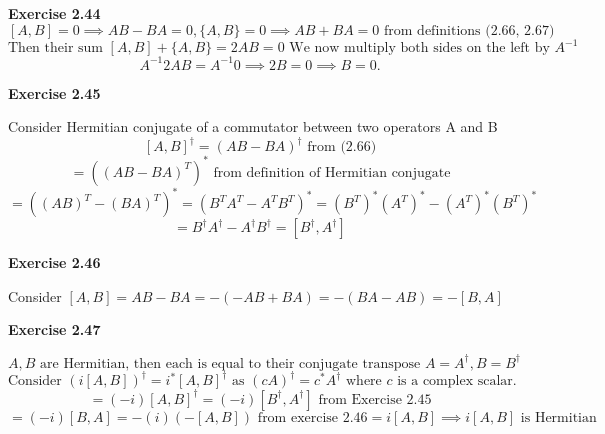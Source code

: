 \documentclass{article}
\begin{document}
\begin{framed}
    
\end{framed}

\bigskip

\begin{framed}
    \noindent \textbf{Exercise 2.44}
    $$
    [A,B] = 0 \implies AB - BA = 0, \{A, B\} = 0 \implies AB + BA = 0 \text{ from definitions (2.66, 2.67)}
    $$
    $$
    \text{Then their sum } [A,B] + \{A,B\} = 2AB = 0 \text{ We now multiply both sides on the left by } A^{-1} \text{}
    $$
    $$
    A^{-1}2AB = A^{-1}0 \implies 2B = 0 \implies B = 0.
    $$
    \medskip
    
    
\end{framed}


\bigskip

\begin{framed}
    \noindent \textbf{Exercise 2.45}
    
    \medskip
    
    Consider Hermitian conjugate of a commutator between two operators A and B 
    $$
    [A,B]^{\dagger} = (AB - BA)^{\dagger} \text{ from (2.66)}
    $$
    $$
    = ((AB - BA)^{T})^{*} \text{ from definition of Hermitian conjugate}
    $$
    $$
    = ((AB)^{T} - (BA)^{T}) ^ {*} = (B^TA^T - A^TB^T)^* = (B^T)^*(A^T)^* - (A^T)^*(B^T)^*
    $$
    $$
    = B^{\dagger}A^{\dagger} - A^{\dagger}B^{\dagger} = [B^{\dagger},A^{\dagger}]
    $$
\end{framed}

\bigskip
\begin{framed}
\noindent \textbf{Exercise 2.46}

\medskip

Consider $[A, B] = AB - BA = -(-AB + BA) = - (BA - AB) = -[B, A]$
\end{framed}

\bigskip

\begin{framed}
    \noindent \textbf{Exercise 2.47}
    
    \medskip

    $$
    A, B \text{ are Hermitian, then each is equal to their conjugate transpose } A = A^{\dagger}, B = B^{\dagger}
    $$
    $$
    \text{Consider } (i[A, B])^{\dagger} = i^{*}[A,B]^{\dagger} \text{ as } (cA)^{\dagger} = c^{*}A^{\dagger} \text{ where } c \text{ is a complex scalar}.
    $$
    $$
    = (-i)[A, B]^{\dagger} = (-i)[B^{\dagger},A^{\dagger}] \text{ from Exercise 2.45}
    $$
    $$
    = (-i)[B, A] = -(i)(-[A,B]) \text{ from exercise 2.46} = i[A,B] \implies i[A,B] \text{ is Hermitian}
    $$
\end{framed}
\end{document}
